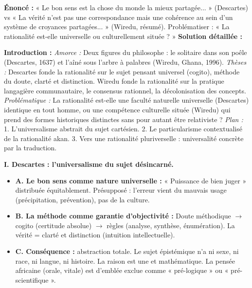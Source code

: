 \documentclass[11pt]{article}
\newcommand{\cle}[1]{{\popxbold\color{popdark}#1}}
\begin{document}
\begin{exoresolu}
\textbf{Énoncé :} « Le bon sens est la chose du monde la mieux partagée... » (Descartes) vs « La vérité n'est pas une correspondance mais une cohérence au sein d'un système de croyances partagées... » (Wiredu, résumé). Problématiser : « La rationalité est-elle universelle ou culturellement située ? »
\tcblower
\textbf{Solution détaillée :}

\textbf{Introduction :}
\emph{Amorce :} Deux figures du philosophe : le solitaire dans son poêle (Descartes, 1637) et l'aîné sous l'arbre à palabres (Wiredu, Ghana, 1996).
\emph{Thèses :} Descartes fonde la rationalité sur le \cle{sujet pensant universel} (cogito), méthode du doute, clarté et distinction. Wiredu fonde la rationalité sur la \cle{pratique langagière communautaire}, le consensus rationnel, la décolonisation des concepts.
\emph{Problématique :} La rationalité est-elle une \cle{faculté naturelle universelle} (Descartes) identique en tout homme, ou une \cle{compétence culturelle située} (Wiredu) qui prend des formes historiques distinctes sans pour autant être relativiste ?
\emph{Plan :} 1. L'universalisme abstrait du sujet cartésien. 2. Le particularisme contextualisé de la rationalité akan. 3. Vers une rationalité \cle{pluriverselle} : universalité concrète par la traduction.

\textbf{I. Descartes : l'universalisme du sujet désincarné.}
\begin{itemize}
    \item \textbf{A. Le bon sens comme nature universelle :} « Puissance de bien juger » distribuée équitablement. Présupposé : l'erreur vient du \cle{mauvais usage} (précipitation, prévention), pas de la culture.
    \item \textbf{B. La méthode comme garantie d'objectivité :} Doute méthodique $\rightarrow$ \cle{cogito} (certitude absolue) $\rightarrow$ règles (analyse, synthèse, énumération). La vérité = \cle{clarté et distinction} (intuition intellectuelle).
    \item \textbf{C. Conséquence :} \cle{abstraction totale}. Le sujet épistémique n'a ni sexe, ni race, ni langue, ni histoire. La raison est \cle{une} et \cle{mathématique}. La pensée africaine (orale, vitale) est d'emblée exclue comme « pré-logique » ou « pré-scientifique ».
\end{itemize}


\end{exoresolu}
\end{document}
